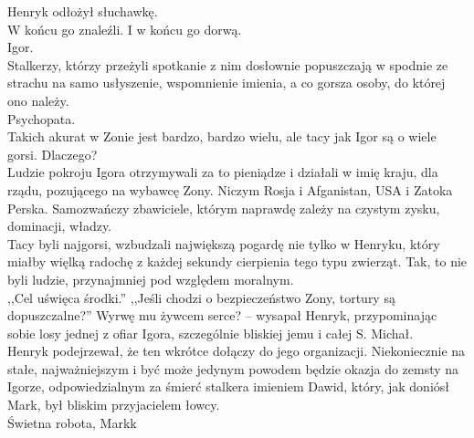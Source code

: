 \documentclass[../MAIN.tex]{subfiles}
\begin{document}
Henryk odłożył słuchawkę.\\
W końcu go znaleźli. I w końcu go dorwą.\\
Igor.\\
Stalkerzy, którzy przeżyli spotkanie z nim dosłownie popuszczają w spodnie ze strachu na samo usłyszenie, wspomnienie imienia, a co gorsza osoby, do której ono należy.\\
Psychopata.\\
Takich akurat w Zonie jest bardzo, bardzo wielu, ale tacy jak Igor są o wiele gorsi. Dlaczego?\\
Ludzie pokroju Igora otrzymywali za to pieniądze i działali w imię kraju, dla rządu, pozującego na wybawcę Zony. Niczym Rosja i Afganistan, USA i Zatoka Perska. Samozwańczy zbawiciele, którym naprawdę zależy na czystym zysku, dominacji, władzy.\\
Tacy byli najgorsi, wzbudzali największą pogardę nie tylko w Henryku, który miałby więlką radochę z każdej sekundy cierpienia tego typu zwierząt. Tak, to nie byli ludzie, przynajmniej pod względem moralnym.\\
,,Cel uświęca środki.''
,,Jeśli chodzi o bezpieczeństwo Zony, tortury są dopuszczalne?''
\sx Wyrwę mu żywcem serce? -- wysapał Henryk, przypominając sobie losy jednej z ofiar Igora, szczególnie bliskiej jemu i całej S.
\qd
Michał.\\
Henryk podejrzewał, że ten wkrótce dołączy do jego organizacji. Niekoniecznie na stałe, najważniejszym i być może jedynym powodem będzie okazja do zemsty na Igorze, odpowiedzialnym za śmierć stalkera imieniem Dawid, który, jak doniósł Mark, był bliskim przyjacielem łowcy.\\
\sx Świetna robota, Mark\3k
\qd
\end{document}
